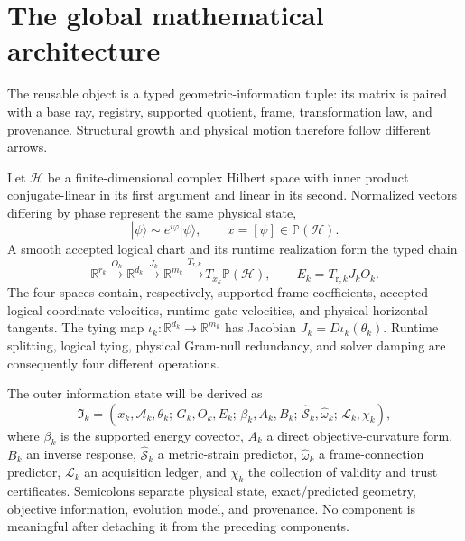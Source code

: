 \documentclass[10pt,twocolumn]{article}
\newcommand{\mathscr}[1]{\mathcal{#1}}
\theoremstyle{definition}
\theoremstyle{remark}
\newcommand{\R}{\mathbb R}
\newcommand{\Hh}{\mathcal H}
\newcommand{\Pj}{\mathbb P}
\newcommand{\rt}{\mathrm r}
\begin{document}
\section{The global mathematical architecture}

\begin{microbox}
The reusable object is a typed geometric-information tuple: its matrix is paired with a base ray, registry, supported quotient, frame, transformation law, and provenance.  Structural growth and physical motion therefore follow different arrows.
\end{microbox}

Let $\Hh$ be a finite-dimensional complex Hilbert space with inner product conjugate-linear in its first argument and linear in its second.  Normalized vectors differing by phase represent the same physical state,
\begin{equation}
 |\psi\rangle\sim e^{i\varphi}|\psi\rangle,
 \qquad x=[\psi]\in\Pj(\Hh).
 \label{eq:ray}
\end{equation}
A smooth accepted logical chart and its runtime realization form the typed chain
\begin{equation}
 \R^{r_k}\xrightarrow{O_k}\R^{d_k}
 \xrightarrow{J_k}\R^{m_k}
 \xrightarrow{T_{\rt,k}}T_{x_k}\Pj(\Hh),
 \qquad E_k=T_{\rt,k}J_kO_k.
 \label{eq:typedchain}
\end{equation}
The four spaces contain, respectively, supported frame coefficients, accepted logical-coordinate velocities, runtime gate velocities, and physical horizontal tangents.  The tying map $\iota_k:\R^{d_k}\to\R^{m_k}$ has Jacobian $J_k=D\iota_k(\theta_k)$.  Runtime splitting, logical tying, physical Gram-null redundancy, and solver damping are consequently four different operations.

The outer information state will be derived as
\begin{equation}
 \mathfrak I_k=(x_k,\mathcal A_k,\theta_k;\,G_k,O_k,E_k;\,\beta_k,A_k,B_k;\,\widehat{\mathcal S}_k,\widehat\omega_k;\,\mathscr L_k,\chi_k),
 \label{eq:statepreview}
\end{equation}
where $\beta_k$ is the supported energy covector, $A_k$ a direct objective-curvature form, $B_k$ an inverse response, $\widehat{\mathcal S}_k$ a metric-strain predictor, $\widehat\omega_k$ a frame-connection predictor, $\mathscr L_k$ an acquisition ledger, and $\chi_k$ the collection of validity and trust certificates.  Semicolons separate physical state, exact/predicted geometry, objective information, evolution model, and provenance.  No component is meaningful after detaching it from the preceding components.
\end{document}
